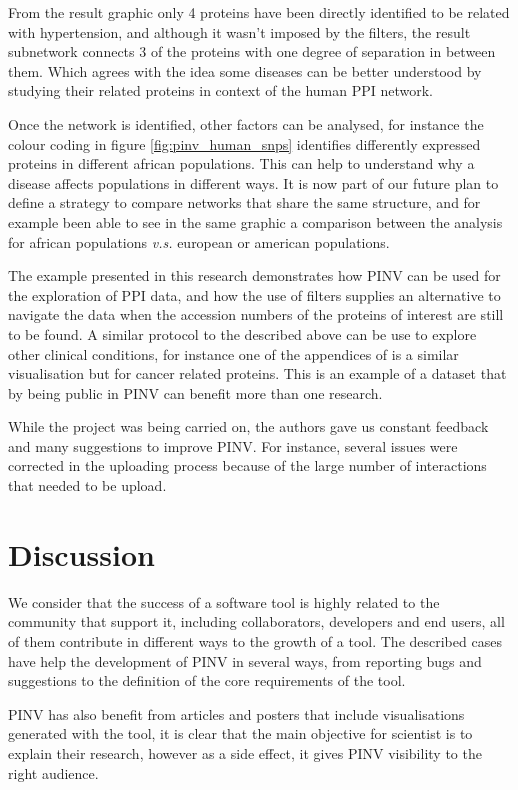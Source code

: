 From the result graphic only 4 proteins have been directly identified to be related with hypertension, and although it wasn't  imposed by the filters, the result subnetwork connects 3 of the proteins with one degree of separation in between them. Which agrees with the idea some diseases can be better understood by studying their related proteins in context of the human PPI network.

Once the network is identified, other factors can be analysed, for instance the colour coding in figure \ref{fig:pinv_human_snps} identifies differently expressed proteins in different african populations. This can help to understand why a disease affects populations in different ways. It is now part of our future plan to define a strategy to compare networks that share the same structure, and for example been able to see in the same graphic a comparison between the analysis for african populations \emph{v.s.} european or american populations. 

The example presented in this research demonstrates how PINV can be used for the exploration of PPI data, and how the use of filters supplies an alternative to navigate the data when the accession numbers of the proteins of interest are still to be found. A similar protocol to the described above can be use to explore other clinical conditions, for instance one of the appendices of \cite{HEE2014} is a similar visualisation but for cancer related proteins. This is an example of a dataset that by being public in PINV can benefit more than one research.

While the project was being carried on, the authors gave us constant feedback and many suggestions to improve PINV. For instance, several issues were corrected in the uploading process because of the large number of interactions that needed to be upload.

\section{Discussion}
We consider that the success of a software tool is highly related to the community that support it, including collaborators, developers and end users, all of them contribute in different ways to the growth of a tool. The described cases have help the development of PINV in several ways, from reporting bugs and suggestions to the definition of the core requirements of the tool. 

PINV has also benefit from articles and posters that include visualisations generated with the tool, it is clear that the main objective for scientist is to explain their research, however as a side effect, it gives PINV visibility to the right audience.

